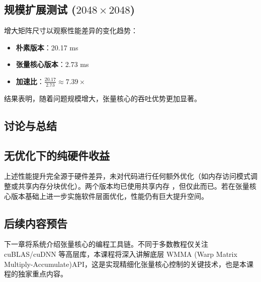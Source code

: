 \subsection{规模扩展测试 ($2048 \times 2048$)}
增大矩阵尺寸以观察性能差异的变化趋势：
\begin{itemize}
    \item \textbf{朴素版本}：20.17 ms
    \item \textbf{张量核心版本}：2.73 ms
    \item \textbf{加速比}：$\frac{20.17}{2.73} \approx 7.39\times$
\end{itemize}
结果表明，随着问题规模增大，张量核心的吞吐优势更加显著。

\subsection{讨论与总结}
\subsection{无优化下的纯硬件收益}
上述性能提升完全源于硬件差异，未对代码进行任何额外优化（如内存访问模式调整或共享内存分块优化）。两个版本均已使用共享内存
，但仅此而已。若在张量核心版本基础上进一步实施软件层面优化，性能仍有巨大提升空间。

\subsection{后续内容预告}
下一章将系统介绍张量核心的编程工具链。不同于多数教程仅关注 cuBLAS/cuDNN 等高层库，本课程将深入讲解底层 WMMA (Warp Matrix Multiply-Accumulate)API，这是实现精细化张量核心控制的关键技术，也是本课程的独家重点内容。

